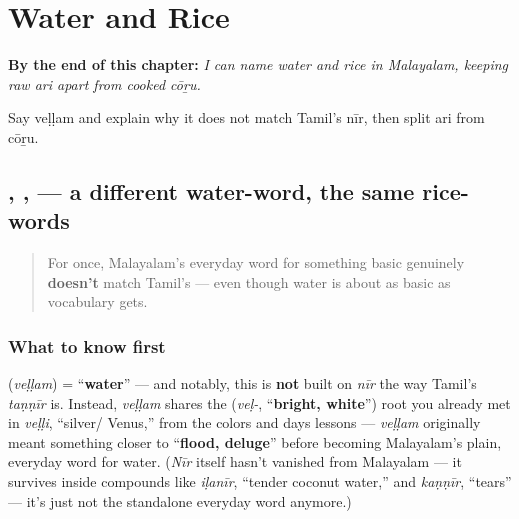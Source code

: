 
\chapter{Water and Rice}
\label{ch:ml-water-and-rice}

\begin{chapteropening}
\textbf{By the end of this chapter:} \emph{I can name water and rice in Malayalam, keeping raw ari apart from cooked cōṟu.}

Say veḷḷam and explain why it does not match Tamil's nīr, then split ari from cōṟu.
\end{chapteropening}

\section[\texorpdfstring{\ml{വെള്ളം} \ml{അരി} \ml{ചോറ്} (veḷḷaṁ ari cōṟŭ)}{വെള്ളം അരി ചോറ് (veḷḷaṁ ari cōṟŭ)}]{, ,  — a different water-word, the same rice-words}

\label{lesson:ML-C15-vellam-ari}



\begin{quote}
For once, Malayalam's everyday word for something basic genuinely \textbf{doesn't} match Tamil's — even though water is about as basic as vocabulary gets.
\end{quote}

\subsection*{What to know first}
\textbf{} (\emph{veḷḷam}) = \textquotedblleft{}\textbf{water}\textquotedblright{} — and notably, this is \textbf{not} built on \emph{nīr} the way Tamil's \emph{taṇṇīr} is. Instead, \emph{veḷḷam} shares the \textbf{} (\emph{veḷ-}, \textquotedblleft{}\textbf{bright, white}\textquotedblright{}) root you already met in \emph{veḷḷi}, \textquotedblleft{}silver/ Venus,\textquotedblright{} from the colors and days lessons — \emph{veḷḷam} originally meant something closer to \textquotedblleft{}\textbf{flood, deluge}\textquotedblright{} before becoming Malayalam's plain, everyday word for water. (\emph{Nīr} itself hasn't vanished from Malayalam — it survives inside compounds like \textbf{} \emph{iḷanīr}, \textquotedblleft{}tender coconut water,\textquotedblright{} and \textbf{} \emph{kaṇṇīr}, \textquotedblleft{}tears\textquotedblright{} — it's just not the standalone everyday word anymore.)

